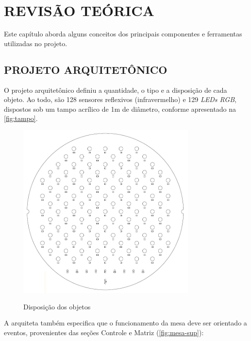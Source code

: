 
\chapter{REVISÃO TEÓRICA}
\label{chap:fundamentacaoTeorica}

Este capítulo aborda alguns conceitos dos principais componentes e ferramentas utilizadas no projeto.

\section{PROJETO ARQUITETÔNICO}
\label{sec:matrizLed}

O projeto arquitetônico definiu a quantidade, o tipo e a disposição de cada objeto. Ao todo, são 128 sensores reflexivos (infravermelho) e 129 \emph{LEDs RGB}, dispostos sob um tampo acrílico de 1m de diâmetro, conforme apresentado na \autoref{fig:tampo}.

\begin{figure}[H]
    \centering
    \caption{Disposição dos objetos}
    \includegraphics[width=0.8\textwidth]{./dados/figuras/tampo}
    \label{fig:tampo}
\end{figure}

A arquiteta também especifica que o funcionamento da mesa deve ser orientado a eventos, provenientes das seções Controle e Matriz (\autoref{fig:mesa-sup}):

